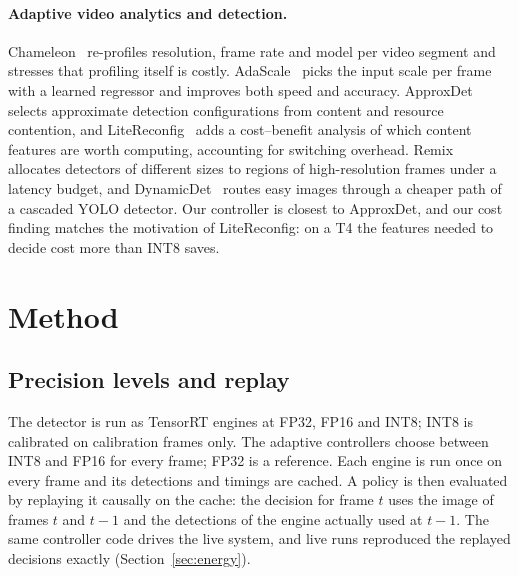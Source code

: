 \documentclass[pdflatex,sn-mathphys-num]{sn-jnl}
\begin{document}
\paragraph{Adaptive video analytics and detection.} Chameleon~\cite{jiang2018chameleon} re-profiles resolution, frame rate and model per video segment and stresses that profiling itself is costly. AdaScale~\cite{chin2019adascale} picks the input scale per frame with a learned regressor and improves both speed and accuracy. ApproxDet~\cite{xu2020approxdet} selects approximate detection configurations from content and resource contention, and LiteReconfig~\cite{xu2022litereconfig} adds a cost--benefit analysis of which content features are worth computing, accounting for switching overhead. Remix~\cite{jiang2021remix} allocates detectors of different sizes to regions of high-resolution frames under a latency budget, and DynamicDet~\cite{lin2023dynamicdet} routes easy images through a cheaper path of a cascaded YOLO detector. Our controller is closest to ApproxDet, and our cost finding matches the motivation of LiteReconfig: on a T4 the features needed to decide cost more than INT8 saves.

\section{Method}\label{sec:method}

\subsection{Precision levels and replay}
The detector is run as TensorRT engines at FP32, FP16 and INT8; INT8 is calibrated on calibration frames only. The adaptive controllers choose between INT8 and FP16 for every frame; FP32 is a reference. Each engine is run once on every frame and its detections and timings are cached. A policy is then evaluated by replaying it causally on the cache: the decision for frame $t$ uses the image of frames $t$ and $t-1$ and the detections of the engine actually used at $t-1$. The same controller code drives the live system, and live runs reproduced the replayed decisions exactly (Section~\ref{sec:energy}).
\end{document}
